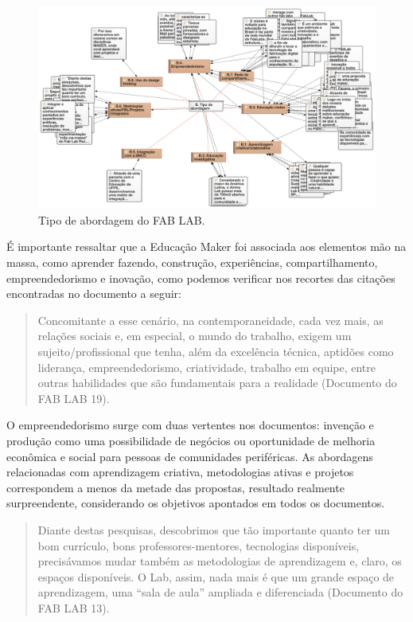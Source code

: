 \documentclass[portuguese]{textolivre}
\begin{document}
\begin{figure}
\centering
\begin{minipage}{\textwidth}
\includegraphics[width=\linewidth]{Fig4.png}
\caption{Tipo de abordagem do FAB LAB.}
\label{fig4}
\end{minipage}
\end{figure}

É importante ressaltar que a Educação Maker foi associada aos elementos mão na massa, como aprender fazendo, construção, experiências, compartilhamento, empreendedorismo e inovação, como podemos verificar nos recortes das citações encontradas no documento a seguir:

\begin{quote}
    Concomitante a esse cenário, na contemporaneidade, cada vez mais, as relações sociais e, em especial, o mundo do trabalho, exigem um sujeito/profissional que tenha, além da excelência técnica, aptidões como liderança, empreendedorismo, criatividade, trabalho em equipe, entre outras habilidades que são fundamentais para a realidade (Documento do FAB LAB 19).
\end{quote}

O empreendedorismo surge com duas vertentes nos documentos: invenção e produção como uma possibilidade de negócios ou oportunidade de melhoria econômica e social para pessoas de comunidades periféricas. As abordagens relacionadas com aprendizagem criativa, metodologias ativas e projetos correspondem a menos da metade das propostas, resultado realmente surpreendente, considerando os objetivos apontados em todos os documentos.

\begin{quote}
    Diante destas pesquisas, descobrimos que tão importante quanto ter um bom currículo, bons professores-mentores, tecnologias disponíveis, precisávamos mudar também as metodologias de aprendizagem e, claro, os espaços disponíveis. O Lab, assim, nada mais é que um grande espaço de aprendizagem, uma ``sala de aula'' ampliada e diferenciada (Documento do FAB LAB 13).
\end{quote}
\end{document}

